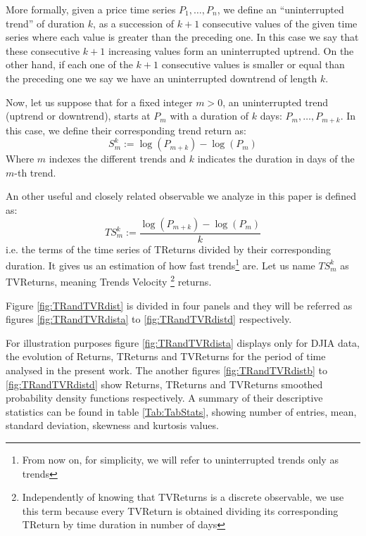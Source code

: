 \documentclass{elsarticle}
\begin{document}
More formally, given a price time series $P_{1},\ldots,P_{n}$, we define an ``uninterrupted trend'' of duration $k$, as a succession of $k+1$ consecutive values of the given time series where each value is greater than the preceding one. In this case we say that these consecutive $k+1$ increasing values form an uninterrupted uptrend. On the other hand, if each one of the $k+1$ consecutive values is smaller or equal than the preceding one we say we have an uninterrupted downtrend of length $k$.

Now, let us suppose that for a fixed integer $m>0$, an uninterrupted trend (uptrend or downtrend), starts at $P_m$ with a duration of $k$ days: $P_{m},\ldots,P_{m+k}$. In this case, we define their corresponding trend return as:
	\begin{equation}
		S_m^k := \log(P_{m+k}) - \log(P_{m})
	\end{equation}
Where $m$ indexes the different trends and $k$ indicates the duration in days of the $m$-th trend.

An other useful and closely related observable we analyze in this paper is defined as:
	\begin{equation}
		TS_m^k :=\frac{ \log(P_{m+k}) - \log(P_{m})}{k}
	\end{equation}
        i.e. the terms of the time series of TReturns divided by their corresponding  duration. It gives us an estimation of how fast trends\footnote{From now on, for simplicity, we will refer to uninterrupted trends only as trends} are. Let us name $TS_m^k$ as TVReturns, meaning Trends Velocity \footnote{Independently of knowing that TVReturns is a discrete observable, we use this term because every TVReturn is obtained dividing its corresponding TReturn by time duration in number of days} returns.

      Figure \ref{fig:TRandTVRdist} is divided in four panels and they will be referred as figures \ref{fig:TRandTVRdista} to \ref{fig:TRandTVRdistd} respectively. 

For illustration purposes figure \ref{fig:TRandTVRdista}  displays only for DJIA data, the evolution of Returns, TReturns and TVReturns for the period of time analysed in the present work. The another figures \ref{fig:TRandTVRdistb} to  \ref{fig:TRandTVRdistd} show Returns, TReturns and TVReturns  smoothed probability density functions respectively.  A summary of their descriptive statistics can be found in table \ref{Tab:TabStats}, showing number of entries, mean, standard deviation, skewness and kurtosis values.
\end{document}
